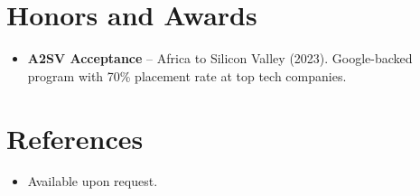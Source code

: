 \documentclass[11pt,a4paper,sans]{moderncv}
\begin{document}
\section{Honors and Awards}
\vspace{1pt}
\begin{itemize}
\item{\textbf{A2SV Acceptance} -- Africa to Silicon Valley (2023). Google-backed program with 70\% placement rate at top tech companies.}
\end{itemize}


\section{References}
\vspace{1pt}
\begin{itemize}
\item{Available upon request.}
\end{itemize}
\end{document}
